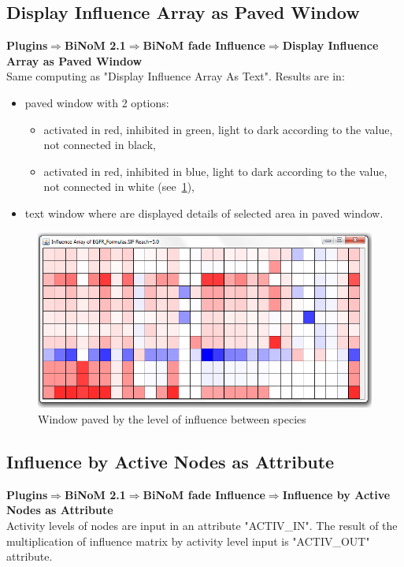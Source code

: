 \subsection{Display Influence Array as Paved Window}
\textbf{Plugins$\Rightarrow$BiNoM 2.1$\Rightarrow$BiNoM fade Influence$\Rightarrow$Display Influence Array as Paved Window}\\
Same computing as "Display Influence Array As Text". Results are in:
\begin{itemize}
\item paved window with 2 options: 
\begin{itemize}
\item activated in red, inhibited in green, light to dark according to the value, not connected in black,
\item activated in red, inhibited in blue, light to dark according to the value, not connected in white (see~\ref{paved_window}),
\end{itemize}
\item text window where are displayed details of selected area in paved window.
\end{itemize}

\begin{figure}
\centering
\includegraphics[width=1.0\textwidth]{graphics/paved_window}
\caption{Window paved by the level of influence between species}
\label{paved_window}
\end{figure}

\subsection{Influence by Active Nodes as Attribute}
\textbf{Plugins$\Rightarrow$BiNoM 2.1$\Rightarrow$BiNoM fade Influence$\Rightarrow$Influence by Active Nodes as Attribute}\\
Activity levels of nodes are input in an attribute "ACTIV\_IN". The result of the multiplication of influence matrix by activity level input is "ACTIV\_OUT" attribute.

